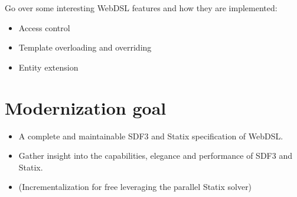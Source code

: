       Go over some interesting WebDSL features and how they are implemented:
      \begin{itemize}
        \item Access control
        \item Template overloading and overriding
        \item Entity extension
      \end{itemize}

  \section{Modernization goal}

    \begin{itemize}
      \item A complete and maintainable SDF3 and Statix specification of WebDSL.
      \item Gather insight into the capabilities, elegance and performance of SDF3 and Statix.
      \item (Incrementalization for free leveraging the parallel Statix solver)
    \end{itemize}
